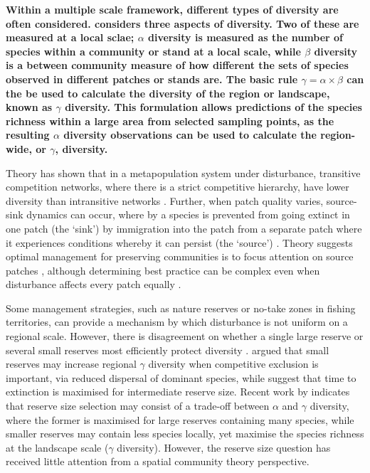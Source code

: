 \textbf{Within a multiple scale framework, different types of diversity are often considered. \cite{whittaker1960vegetation} considers three aspects of diversity. Two of these are measured at a local sclae; $\alpha$ diversity is measured as the number of species within a community or stand at a local scale, while $\beta$ diversity is a  between community measure of how different the sets of species observed in different patches or stands are. The basic rule $\gamma=\alpha \times \beta$ can the be used to calculate the diversity of the region or landscape, known as $\gamma$ diversity. This formulation allows predictions of the species richness within a large area from selected sampling points, as the resulting $\alpha$ diversity observations can be used to calculate the region-wide, or $\gamma$, diversity.}

Theory has shown that in a metapopulation system under disturbance, transitive competition networks, where there is a strict competitive hierarchy, have lower diversity than intransitive networks \citep{caswell1991disturbance}. Further, when patch quality varies, source-sink dynamics can occur, where by a species is prevented from going extinct in one patch (the `sink') by immigration into the patch from a separate patch where it experiences conditions whereby it can persist (the `source')  \citep{pulliam1988sources}. Theory suggests optimal management for preserving communities is to focus attention on source patches \citep[e.g.][]{runge2006role}, although determining best practice can be complex even when disturbance affects every patch equally \citep{strasser2012contributions}.

Some management strategies, such as nature reserves or no-take zones in fishing territories, can provide a mechanism by which disturbance is not uniform on a regional scale. However, there is disagreement on whether a single large reserve or several small reserves most efficiently protect diversity \citep{simberloff1982refuge}. \cite{simberloff1991nestedness} argued that small reserves may increase regional $\gamma$ diversity when competitive exclusion is important, via reduced dispersal of dominant species, while \cite{ovaskainen2002long} suggest that time to extinction is maximised for intermediate reserve size. Recent work by \cite{lasky2013reserve} indicates that reserve size selection may consist of a trade-off between $\alpha$ and $\gamma$ diversity, where the former is maximised for large reserves containing many species, while smaller reserves may contain less species locally, yet maximise the species richness at the landscape scale ($\gamma$ diversity). However, the reserve size question has received little attention from a spatial community theory perspective.

